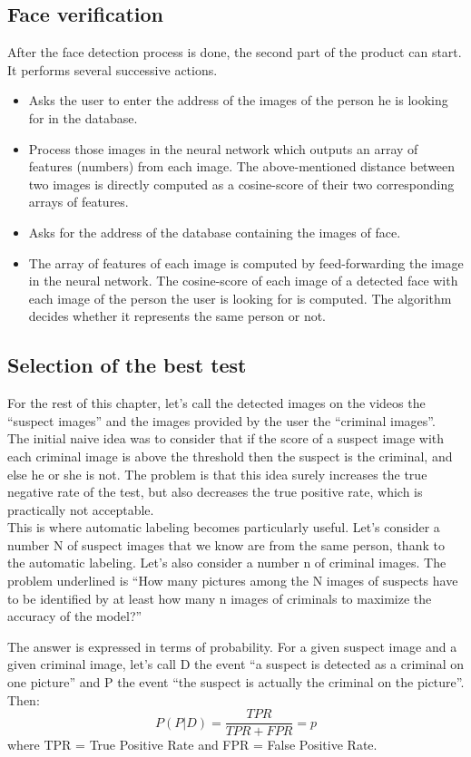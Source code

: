 \subsection{Face verification}
After the face detection process is done, the second part of the product can start.
It performs several successive actions.
\begin{itemize}
\item Asks the user to enter the address of the images of the person he is looking for in the database.
\item Process those images in the neural network which outputs an array of features (numbers) from each image. The above-mentioned distance between two images is directly computed as a cosine-score of their two corresponding arrays of features.
\item Asks for the address of the database containing the images of face.
\item The array of features of each image is computed by feed-forwarding the image in the neural network. The cosine-score of each image of a detected face with each image of the person the user is looking for is computed. The algorithm decides whether it represents the same person or not.
\end{itemize}
\subsection{Selection of the best test}
For the rest of this chapter, let's call the detected images on the videos the \enquote{suspect images} and the images provided by the user the \enquote{criminal images}.\\
The initial naive idea was to consider that if the score of a suspect image with each criminal image is above the threshold then the suspect is the criminal, and else he or she is not. The problem is that this idea surely increases the true negative rate of the test, but also decreases the true positive rate, which is practically not acceptable.\\
This is where automatic labeling becomes particularly useful. Let's consider a number N of suspect images that we know are from the same person, thank to the automatic labeling.
Let's also consider a number n of criminal images.
The problem underlined is \enquote{How many pictures among the N images of suspects have to be identified by at least how many n images of criminals to maximize the accuracy of the model?}

The answer is expressed in terms of probability.
For a given suspect image and a given criminal image, let's call D the event \enquote{a suspect is detected as a criminal on one picture} and P the event \enquote{the suspect is actually the criminal on the picture}.
Then:\\
\[P(P|D)=\frac{TPR}{TPR+FPR}=p\]
where TPR = True Positive Rate and FPR = False Positive Rate.

